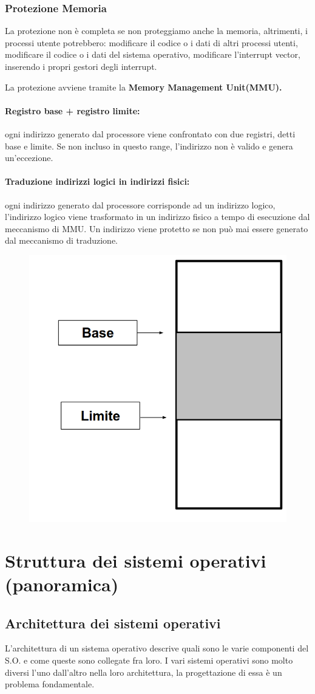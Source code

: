 \subsubsection{Protezione Memoria}
La protezione non è completa se non proteggiamo anche la
memoria, altrimenti, i processi utente potrebbero: modificare il codice o i dati di altri processi utenti, modificare il codice o i dati del sistema operativo, modificare l'interrupt vector, inserendo i propri gestori degli interrupt.

La protezione avviene tramite la \textbf{Memory Management Unit(MMU).}

\paragraph{Registro base + registro limite:} ogni indirizzo generato dal processore viene confrontato con due registri,
detti base e limite. Se non incluso in questo range, l'indirizzo non è valido e genera un'eccezione.
\paragraph{Traduzione indirizzi logici in indirizzi fisici:} ogni indirizzo generato dal processore corrisponde ad un indirizzo logico, l'indirizzo logico viene trasformato in un indirizzo fisico a tempo di esecuzione dal meccanismo di MMU.
Un indirizzo viene protetto se non può mai essere generato
dal meccanismo di traduzione.

\begin{figure} [h]
    \centering
    \includegraphics[width=0.3\linewidth]{Images/Screenshot 2024-12-17 at 19-31-43 so-01-intro-os.pptx - so-01-intro-os.pdf.png}
    \label{fig:enter-label}
\end{figure}

\newpage
\section{Struttura dei sistemi operativi
(panoramica)}

\subsection{Architettura dei sistemi operativi}
L'architettura di un sistema operativo descrive quali sono le varie componenti del S.O. e come queste sono
collegate fra loro. I vari sistemi operativi sono molto diversi l'uno dall'altro nella loro architettura, la progettazione di essa è un problema fondamentale.

